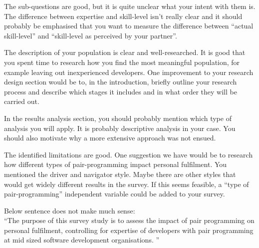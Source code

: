 \documentclass[times, 10pt,twocolumn]{article}
\begin{document}
The sub-questions are good, but it is quite unclear what your intent with them is. The difference between expertise and skill-level isn't really clear and it should probably be emphasised that you want to measure the difference between ``actual skill-level'' and ``skill-level as perceived by your partner''. 


The description of your population is clear and well-researched. It is good that you spent time to research how you find the most meaningful population, for example leaving out inexperienced developers. One improvement to your research design section would be to, in the introduction, briefly outline your research process and describe which stages it includes and in what order they will be carried out. 

In the results analysis section, you should probably mention which type of analysis you will apply. It is probably descriptive analysis in your case. You should also motivate why a more extensive approach was not ensued. 

The identified limitations are good. One suggestion we have would be to research how different types of pair-programming impact personal fulfilment. You mentioned the driver and navigator style. Maybe there are other styles that would get widely different results in the survey. If this seems feasible, a ``type of pair-programming'' independent variable could be added to your survey. 


Below sentence does not make much sense: \\
``The purpose of this survey study is to assess the impact of pair programming on personal fulfilment, controlling for expertise of developers with pair programming at mid sized software development organisations. ''
\end{document}
